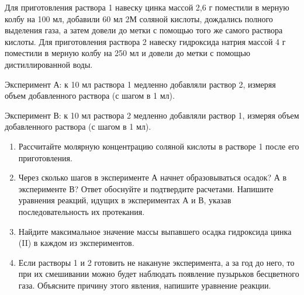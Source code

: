 
Для приготовления раствора 1 навеску цинка массой 2,6 г поместили в мерную колбу на 100 мл, добавили 60 мл 2М 
соляной кислоты, дождались полного выделения газа, а затем довели до метки с помощью того же самого раствора 
кислоты. Для приготовления раствора 2 навеску гидроксида натрия массой 4 г поместили в мерную колбу на 250 мл и 
довели до метки с помощью дистиллированной воды. 

Эксперимент А: к 10 мл раствора 1 медленно добавляли раствор 2, измеряя объем добавленного раствора 
(с шагом в 1 мл).

Эксперимент В: к 10 мл раствора 2 медленно добавляли раствор 1, измеряя объем добавленного раствора 
(с шагом в 1 мл).

\begin{enumerate}
    \item Рассчитайте молярную концентрацию соляной кислоты в растворе 1 после его приготовления.
    \item Через сколько шагов в эксперименте А начнет образовываться осадок? А в эксперименте В? Ответ 
    обоснуйте и подтвердите расчетами. Напишите уравнения реакций, идущих в экспериментах А и В, указав 
    последовательность их протекания.
    \item Найдите максимальное значение массы выпавшего осадка гидроксида цинка (II) в каждом из экспериментов.
    \item Если растворы 1 и 2 готовить не накануне эксперимента, а за год до него, то при их смешивании можно 
    будет наблюдать появление пузырьков бесцветного газа. Объясните причину этого явления, напишите уравнение 
    реакции.
\end{enumerate}
